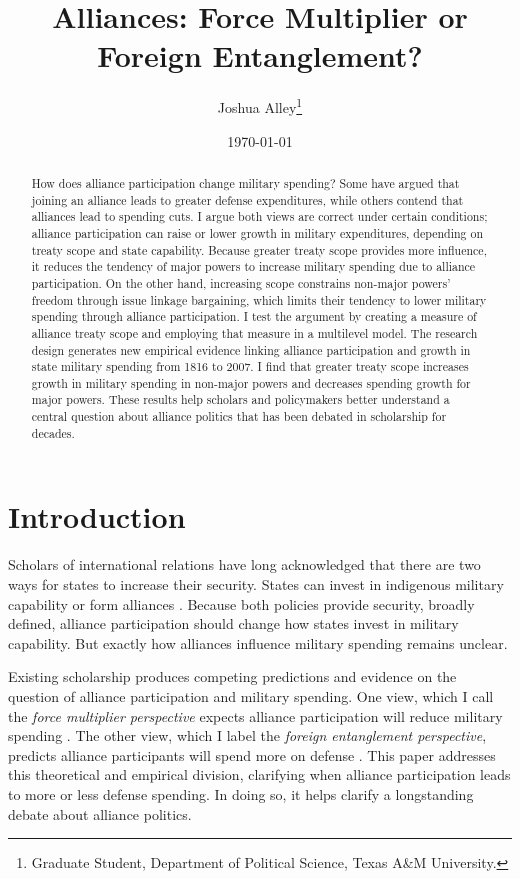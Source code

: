 \documentclass[12pt]{article}
\title{\textbf{Alliances: Force Multiplier or Foreign Entanglement?}}
\author{Joshua Alley\footnote{Graduate Student,
Department of Political Science, Texas A\&M University.}}
\date{{\normalsize \today}}
\begin{document}
\maketitle 

\newpage 

\doublespace 

\begin{abstract}
How does alliance participation change military spending? 
Some have argued that joining an alliance leads to greater defense expenditures, while others contend that alliances lead to spending cuts.
I argue both views are correct under certain conditions; alliance participation can raise or lower growth in military expenditures, depending on treaty scope and state capability. 
Because greater treaty scope provides more influence, it reduces the tendency of major powers to increase military spending due to alliance participation. 
On the other hand, increasing scope constrains non-major powers' freedom through issue linkage bargaining, which limits their tendency to lower military spending through alliance participation.
I test the argument by creating a measure of alliance treaty scope and employing that measure in a multilevel model. 
The research design generates new empirical evidence linking alliance participation and growth in state military spending from 1816 to 2007. 
I find that greater treaty scope increases growth in military spending in non-major powers and decreases spending growth for major powers.  
These results help scholars and policymakers better understand a central question about alliance politics that has been debated in scholarship for decades. 
\end{abstract}



\section{Introduction}


Scholars of international relations have long acknowledged that there are two ways for states to increase their security. 
States can invest in indigenous military capability or form alliances \citep{Morgenthau1948, Altfield1984, Morrow1993}.
Because both policies provide security, broadly defined, alliance participation should change how states invest in military capability. 
But exactly how alliances influence military spending remains unclear. 


Existing scholarship produces competing predictions and evidence on the question of alliance participation and military spending. 
One view, which I call the \textit{force multiplier perspective} expects alliance participation will reduce military spending \citep{Morrow1993, Conybeare1994, DigiuseppePoast2016}. 
The other view, which I label the \textit{foreign entanglement perspective}, predicts alliance participants will spend more on defense \citep{Diehl1994, MorganPalmer2006}. 
This paper addresses this theoretical and empirical division, clarifying when alliance participation leads to more or less defense spending. 
In doing so, it helps clarify a longstanding debate about alliance politics.
\end{document}
